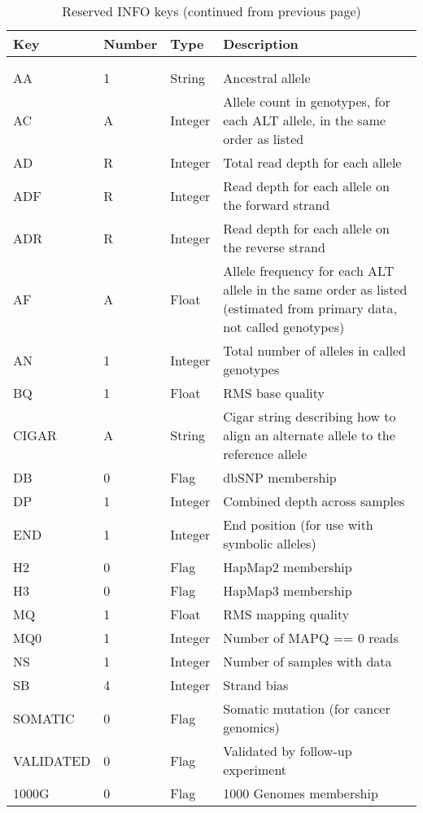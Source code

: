 \documentclass[8pt]{article}
\begin{document}
\begin{longtable}[c]{ | p{2.5cm} | p{1.5cm} | p{1.5cm} | p{10.3cm} | }
	\hline
	Key		& Number	& Type		& Description \\ \hline
  \endhead
    \hline
    \multicolumn{4}{l}{} \\
    \caption{\label{table:reserved-info}Reserved INFO keys (continued on next page)}
  \endfoot
    \hline
    \multicolumn{4}{l}{} \\
    \caption{Reserved INFO keys (continued from previous page)}
  \endlastfoot
	AA		& 1		& String	& Ancestral allele \\
	AC		& A		& Integer	& Allele count in genotypes, for each ALT allele, in the same order as listed  \\
	AD		& R		& Integer	& Total read depth for each allele \\
	ADF		& R		& Integer	& Read depth for each allele on the forward strand \\
	ADR		& R		& Integer	& Read depth for each allele on the reverse strand \\
	AF		& A		& Float		& Allele frequency for each ALT allele in the same order as listed (estimated from primary data, not called genotypes) \\
	AN		& 1		& Integer	& Total number of alleles in called genotypes \\
	BQ   		& 1		& Float		& RMS base quality \\
	CIGAR		& A		& String	& Cigar string describing how to align an alternate allele to the reference allele \\
	DB		& 0		& Flag		& dbSNP membership \\
	DP		& 1		& Integer	& Combined depth across samples \\
	END		& 1		& Integer	& End position (for use with symbolic alleles) \\
	H2		& 0		& Flag		& HapMap2 membership \\
	H3		& 0		& Flag		& HapMap3 membership \\
	MQ		& 1		& Float		& RMS mapping quality \\
	MQ0   		& 1		& Integer	& Number of MAPQ == 0 reads \\
	NS		& 1		& Integer	& Number of samples with data \\
	SB		& 4		& Integer	& Strand bias \\
	SOMATIC		& 0		& Flag		& Somatic mutation (for cancer genomics) \\
	VALIDATED	& 0		& Flag		& Validated by follow-up experiment \\
	1000G		& 0		& Flag		& 1000 Genomes membership \\
\end{longtable}
\end{document}
